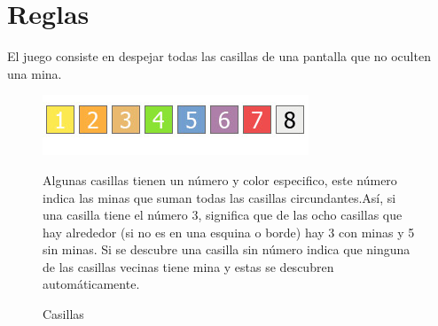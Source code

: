 \section{Reglas}

El juego consiste en despejar todas las casillas de una pantalla que no oculten una mina.
\\
\begin{figure}[htbp]
\begin{center}
\includegraphics[width=.75\textwidth]{./imagenes/Casillas.jpg}
\caption{Casillas}
\end{center}
Algunas casillas tienen un número y color especifico, este número indica las minas que suman todas las casillas circundantes.Así, si una casilla tiene el número 3, significa que de las ocho casillas que hay alrededor (si no es en una esquina o borde) hay 3 con minas y 5 sin minas. Si se descubre una casilla sin número indica que ninguna de las casillas vecinas tiene mina y estas se descubren automáticamente.
\end{figure}
 
